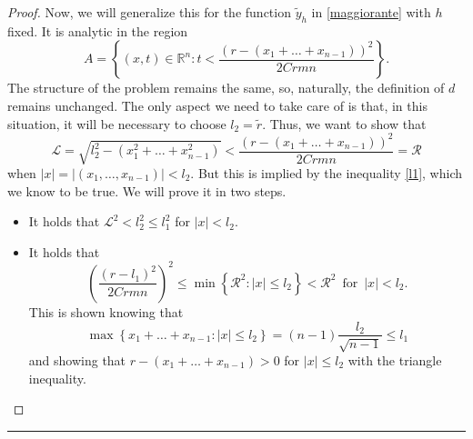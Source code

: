 \begin{proof}
Now, we will generalize this for the function $\widetilde{y}_h$ in \ref{maggiorante} with $h$ fixed. It is analytic in the region 
$$A = \left\{ (x,t) \in \mathbb{R}^n : t<\frac{(r-(x_1+\ldots +x_{n-1}))^2}{2Crmn} \right\} .$$
The structure of the problem remains the same, so, naturally, the definition of $d$ remains unchanged. The only aspect we need to take care of is that, in this situation, it will be necessary to choose $l_2 =\widetilde{r}$. 
Thus, we want to show that $$\mathcal{L}=\sqrt{l_2^2-(x_1^2+\ldots +x_{n-1}^2)} < \frac{(r-(x_1+\ldots +x_{n-1}))^2}{2Crmn}=\mathcal{R}$$
when $|x|=|(x_1,\ldots ,x_{n-1})|< l_2$. But this is implied by the inequality \ref{l1}, which we know to be true. We will prove it in two steps.
\begin{itemize}
\item It holds that $\mathcal{L}^2< l_2^2 \leq l_1^2$ for $|x|< l_2$.
\item It holds that $$\left(\frac{(r-l_1)^2}{2Crmn}\right)^2 \leq \min \left\{ \mathcal{R}^2 : |x|\leq l_2 \right\}< \mathcal{R}^2 \, \text{ for } \, |x|< l_2.$$
This is shown knowing that $$\max \left\{ x_1+\ldots +x_{n-1} : |x|\leq l_2\right\}= (n-1)\frac{l_2}{\sqrt{n-1}}\leq l_1$$ and showing that $r-(x_1+\ldots +x_{n-1})>0$ for $|x|\leq l_2$ with the triangle inequality.
\qedhere
\end{itemize}
\end{proof}

\noindent\rule[0.5ex]{\linewidth}{0.2pt}

